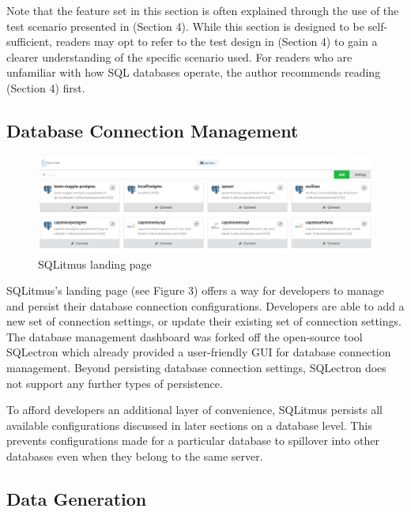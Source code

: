 \documentclass[12pt]{article}
\begin{document}
\begin{spacing}{1.9}
		Note that the feature set in this section is often explained through the use of the test scenario presented in (Section 4). While this section is designed to be self-sufficient, readers may opt to refer to the test design in (Section 4) to gain a clearer understanding of the specific scenario used. For readers who are unfamiliar with how SQL databases operate, the author recommends reading (Section 4) first.
		
		
		\subsection{Database Connection Management}
		
		
		\begin{figure}[H]
			\centering
			\includegraphics[width=\textwidth]{3-1.png}
			\caption{SQLitmus landing page }
			
		\end{figure}
		
		SQLitmus's landing page (see Figure 3) offers a way for developers to manage and persist their database connection configurations. Developers are able to add a new set of connection settings, or update their existing set of connection settings. The database management dashboard was forked off the open-source tool SQLectron which already provided a user-friendly GUI for database connection management. Beyond persisting database connection settings, SQLectron does not support any further types of persistence.
		
		To afford developers an additional layer of convenience, SQLitmus persists all available configurations discussed in later sections on a database level. This prevents configurations made for a particular database to spillover into other databases even when they belong to the same server.
		
		\subsection{Data Generation}
		

\end{spacing}
\end{document}

